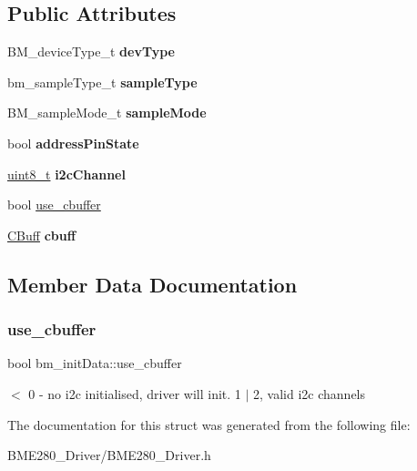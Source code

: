 \subsection*{Public Attributes}
\begin{DoxyCompactItemize}
\item 
\mbox{\label{structbm__initData_a190573a231e043683f5d56706f83c57f}} 
B\+M\+\_\+device\+Type\+\_\+t {\bfseries dev\+Type}
\item 
\mbox{\label{structbm__initData_aa57e27b3a27b573a068ab2aff0a5eda9}} 
bm\+\_\+sample\+Type\+\_\+t {\bfseries sample\+Type}
\item 
\mbox{\label{structbm__initData_a6fba51e1a283f9906a9ba726a5c72c5f}} 
B\+M\+\_\+sample\+Mode\+\_\+t {\bfseries sample\+Mode}
\item 
\mbox{\label{structbm__initData_a7f827d76e1cd9d466ebf7808637f9802}} 
bool {\bfseries address\+Pin\+State}
\item 
\mbox{\label{structbm__initData_a3c93ebe9567281b7b6d3a206a568f1fe}} 
\hyperlink{vl53l0x__types_8h_aba7bc1797add20fe3efdf37ced1182c5}{uint8\+\_\+t} {\bfseries i2c\+Channel}
\item 
bool \hyperlink{structbm__initData_a147cdbe81bcbd04fd35e560d84438481}{use\+\_\+cbuffer}
\item 
\mbox{\label{structbm__initData_a1db9fa0fbd20d6e568a981c08b4c5750}} 
\hyperlink{structCBuffer__Handle}{C\+Buff} {\bfseries cbuff}
\end{DoxyCompactItemize}


\subsection{Member Data Documentation}
\mbox{\label{structbm__initData_a147cdbe81bcbd04fd35e560d84438481}} 
\subsubsection{\texorpdfstring{use\+\_\+cbuffer}{use\_cbuffer}}
{\footnotesize\ttfamily bool bm\+\_\+init\+Data\+::use\+\_\+cbuffer}

$<$ 0 -\/ no i2c initialised, driver will init. 1 $\vert$ 2, valid i2c channels 

The documentation for this struct was generated from the following file\+:\begin{DoxyCompactItemize}
\item 
B\+M\+E280\+\_\+\+Driver/B\+M\+E280\+\_\+\+Driver.\+h\end{DoxyCompactItemize}
